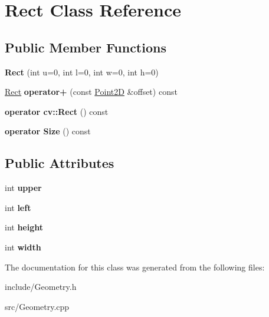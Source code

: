 \hypertarget{classRect}{}\section{Rect Class Reference}
\label{classRect}
\subsection*{Public Member Functions}
\begin{DoxyCompactItemize}
\item 
\hypertarget{classRect_ad197c38803bb8538dd04e5a92b5e12e6}{}{\bfseries Rect} (int u=0, int l=0, int w=0, int h=0)\label{classRect_ad197c38803bb8538dd04e5a92b5e12e6}

\item 
\hypertarget{classRect_a7fbb8992edb8c3839c83045213d21631}{}\hyperlink{classRect}{Rect} {\bfseries operator+} (const \hyperlink{classPoint2D}{Point2\+D} \&offset) const \label{classRect_a7fbb8992edb8c3839c83045213d21631}

\item 
\hypertarget{classRect_afb25e86036b7faa93e86aee8ba24cd35}{}{\bfseries operator cv\+::\+Rect} () const \label{classRect_afb25e86036b7faa93e86aee8ba24cd35}

\item 
\hypertarget{classRect_a78ef656476b85aa5ba0f8dd70a6232d3}{}{\bfseries operator Size} () const \label{classRect_a78ef656476b85aa5ba0f8dd70a6232d3}

\end{DoxyCompactItemize}
\subsection*{Public Attributes}
\begin{DoxyCompactItemize}
\item 
\hypertarget{classRect_aaba0474a7052cee8cadd159c306e27bd}{}int {\bfseries upper}\label{classRect_aaba0474a7052cee8cadd159c306e27bd}

\item 
\hypertarget{classRect_ab0841a51d249d8560ddca36054fd1e57}{}int {\bfseries left}\label{classRect_ab0841a51d249d8560ddca36054fd1e57}

\item 
\hypertarget{classRect_ad79d7bf12771a81627a672452437011d}{}int {\bfseries height}\label{classRect_ad79d7bf12771a81627a672452437011d}

\item 
\hypertarget{classRect_a367714e71d566668addb140c7981b5bc}{}int {\bfseries width}\label{classRect_a367714e71d566668addb140c7981b5bc}

\end{DoxyCompactItemize}


The documentation for this class was generated from the following files\+:\begin{DoxyCompactItemize}
\item 
include/Geometry.\+h\item 
src/Geometry.\+cpp\end{DoxyCompactItemize}
